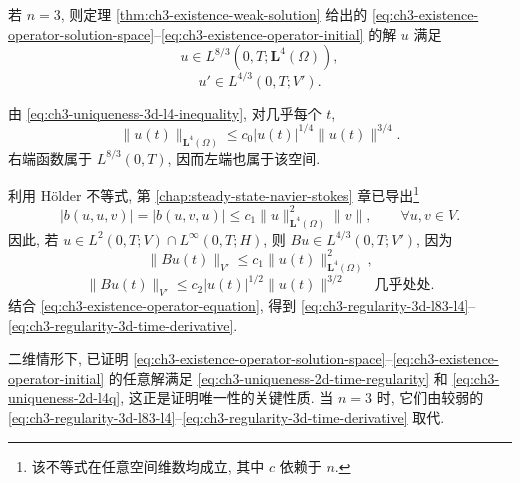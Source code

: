 \hypertarget{chapter-03-page-216}{}
\begin{Theorem}
\label{thm:ch3-regularity-3d}
若 $n=3$, 则定理 \ref{thm:ch3-existence-weak-solution} 给出的 \eqref{eq:ch3-existence-operator-solution-space}--\eqref{eq:ch3-existence-operator-initial} 的解 $u$ 满足
\begin{equation}
u\in L^{8/3}(0,T;\mathbf L^4(\Omega)),
\label{eq:ch3-regularity-3d-l83-l4}
\end{equation}
\begin{equation}
u'\in L^{4/3}(0,T;V').
\label{eq:ch3-regularity-3d-time-derivative}
\end{equation}
\end{Theorem}

\begin{Proof}
由 \eqref{eq:ch3-uniqueness-3d-l4-inequality}, 对几乎每个 $t$,
\begin{equation}
\lVert u(t)\rVert_{\mathbf L^4(\Omega)}
\leq c_0|u(t)|^{1/4}\lVert u(t)\rVert^{3/4}.
\label{eq:ch3-regularity-3d-l4-pointwise}
\end{equation}
右端函数属于 $L^{8/3}(0,T)$, 因而左端也属于该空间.

利用 Hölder 不等式, 第 \ref{chap:steady-state-navier-stokes} 章已导出\footnote{该不等式在任意空间维数均成立, 其中 $c$ 依赖于 $n$.}
\begin{equation}
|b(u,u,v)|=|b(u,v,u)|
\leq c_1\lVert u\rVert_{\mathbf L^4(\Omega)}^2\lVert v\rVert,
\qquad\forall u,v\in V.
\label{eq:ch3-regularity-3d-bu-l4-bound}
\end{equation}
因此, 若 $u\in L^2(0,T;V)\cap L^\infty(0,T;H)$, 则 $Bu\in L^{4/3}(0,T;V')$, 因为
\begin{equation}
\lVert Bu(t)\rVert_{V'}\leq c_1\lVert u(t)\rVert_{\mathbf L^4(\Omega)}^2,
\label{eq:ch3-regularity-3d-bu-l4}
\end{equation}
\begin{equation}
\lVert Bu(t)\rVert_{V'}\leq c_2|u(t)|^{1/2}\lVert u(t)\rVert^{3/2}
\qquad\text{几乎处处}.
\label{eq:ch3-regularity-3d-bu-energy}
\end{equation}
结合 \eqref{eq:ch3-existence-operator-equation}, 得到 \eqref{eq:ch3-regularity-3d-l83-l4}--\eqref{eq:ch3-regularity-3d-time-derivative}.
\end{Proof}

二维情形下, 已证明 \eqref{eq:ch3-existence-operator-solution-space}--\eqref{eq:ch3-existence-operator-initial} 的任意解满足 \eqref{eq:ch3-uniqueness-2d-time-regularity} 和 \eqref{eq:ch3-uniqueness-2d-l4q}, 这正是证明唯一性的关键性质. 当 $n=3$ 时, 它们由较弱的 \eqref{eq:ch3-regularity-3d-l83-l4}--\eqref{eq:ch3-regularity-3d-time-derivative} 取代.

